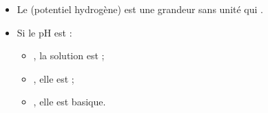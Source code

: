 \begin{mybilan}
	\begin{itemize}
		\item Le  (potentiel hydrogène) est une grandeur sans unité qui .
		\item Si le pH est :
			\begin{itemize}
				\item {}, la solution est ;
				\item {}, elle est ;
				\item {}, elle est basique.
			\end{itemize}
	\end{itemize}
\end{mybilan}